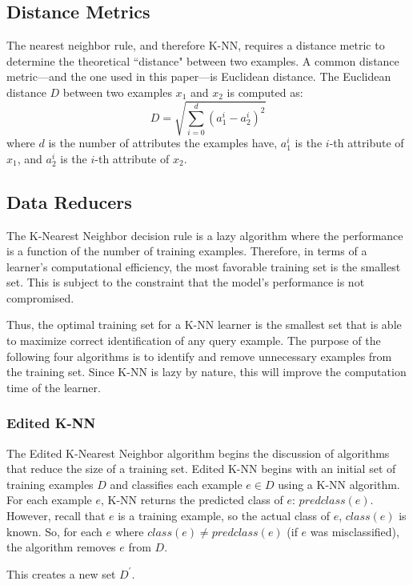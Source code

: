 \documentclass[twoside,11pt]{article}
\begin{document}
\subsection{Distance Metrics}

The nearest neighbor rule, and therefore K-NN, requires a distance metric to determine the theoretical ``distance" between two examples. A common distance metric---and the one used in this paper---is Euclidean distance. The Euclidean distance $D$ between two examples $x_1$ and $x_2$ is computed as:
$$D = \sqrt{\sum_{i=0}^{d}(a_1^i - a_2^i)^2}$$
where $d$ is the number of attributes the examples have, $a_1^i$ is the $i$-th attribute of $x_1$, and $a_2^i$ is the $i$-th attribute of $x_2$.

\subsection{Data Reducers}
The K-Nearest Neighbor decision rule is a lazy algorithm where the performance is a function of the number of training examples. Therefore, in terms of a learner's computational efficiency, the most favorable training set is the smallest set.
This is subject to the constraint that the model's performance is not compromised.

Thus, the optimal training set for a K-NN learner is the smallest set that is able to maximize correct identification of any query example.
The purpose of the following four algorithms is to identify and remove unnecessary examples from the training set. Since K-NN is lazy by nature, this will improve the computation time of the learner.


\subsubsection{Edited K-NN}
The Edited K-Nearest Neighbor algorithm begins the discussion of algorithms that reduce the size of a training set. Edited K-NN begins with an initial set of training examples $D$ and classifies each example $e \in D$ using a K-NN algorithm. For each example $e$, K-NN returns the predicted class of $e$: $predclass(e)$. However, recall that $e$ is a training example, so the actual class of $e$, $class(e)$ is known. So, for each $e$ where $class(e) \neq predclass(e)$ (if $e$ was misclassified), the algorithm removes $e$ from $D$.

This creates a new set $D^\prime$. 
\end{document}
